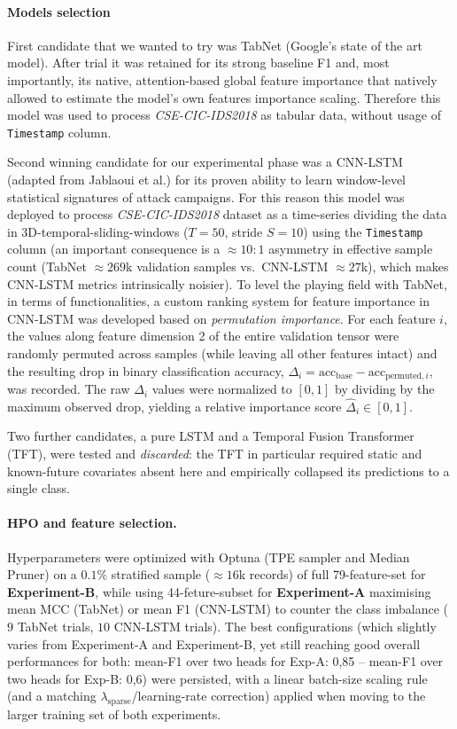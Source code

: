 \documentclass[a4paper, 9pt]{extarticle}
\begin{document}
\paragraph{Models selection}
First candidate that we wanted to try was TabNet (Google's state of the art model). After trial it was retained for its strong baseline F1 and, most importantly, its native, attention-based global feature importance that natively allowed to estimate the model's own features importance scaling. Therefore this model was used to process \emph{CSE-CIC-IDS2018} as tabular data, without usage of \texttt{Timestamp} column.

Second winning candidate for our experimental phase was a CNN-LSTM (adapted from Jablaoui et al.) for its proven ability to learn window-level statistical signatures of attack campaigns. For this reason this model was deployed to process \emph{CSE-CIC-IDS2018} dataset as a time-series dividing the data in 3D-temporal-sliding-windows ($T=50$, stride $S=10$) using the \texttt{Timestamp} column (an important consequence is a $\approx 10{:}1$ asymmetry in effective sample count (TabNet $\approx 269$k validation samples vs.\ CNN-LSTM $\approx 27$k), which makes CNN-LSTM metrics intrinsically noisier). To level the playing field with TabNet, in terms of functionalities, a custom ranking system for feature importance in CNN-LSTM was developed based on \emph{permutation importance}. For each feature $i$, the values along feature dimension 2 of the entire validation tensor were randomly permuted across samples (while leaving all other features intact) and the resulting drop in binary classification accuracy, $\Delta_i = \mathrm{acc}_{\text{base}} - \mathrm{acc}_{\text{permuted},i}$, was recorded.  The raw $\Delta_i$ values were normalized to $[0, 1]$ by dividing by the maximum observed drop, yielding a relative importance score $\hat{\Delta}_i \in [0, 1]$.

Two further candidates, a pure LSTM and a Temporal Fusion Transformer (TFT), were tested and \emph{discarded}: the TFT in particular required static and known-future covariates absent here and empirically collapsed its predictions to a single class. 


\paragraph{HPO and feature selection.}
Hyperparameters were optimized with Optuna (TPE sampler and Median Pruner) on a $0.1\%$ stratified sample ($\approx 16$k records) of full 79-feature-set for \textbf{Experiment-B}, while using 44-feture-subset for \textbf{Experiment-A} maximising mean MCC (TabNet) or mean F1 (CNN-LSTM) to counter the class imbalance ($9$ TabNet trials, $10$ CNN-LSTM trials). The best configurations (which slightly varies from Experiment-A and Experiment-B, yet still reaching good overall performances for both: mean-F1 over two heads for Exp-A: 0,85 -- mean-F1 over two heads for Exp-B: 0,6) were persisted, with a linear batch-size scaling rule (and a matching $\lambda_{\text{sparse}}$/learning-rate correction) applied when moving to the larger training set of both experiments.
\end{document}
